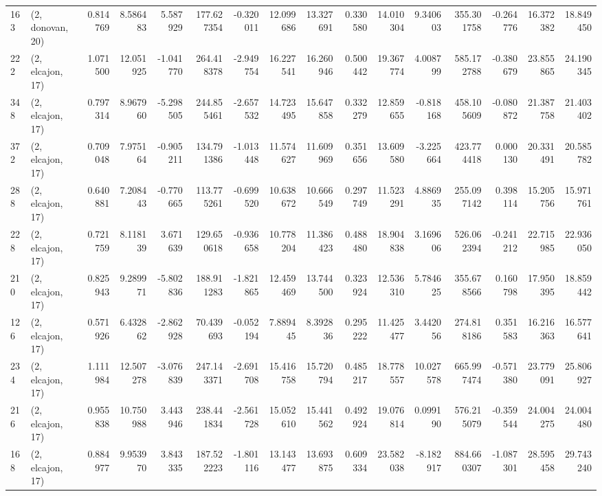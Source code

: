 \begin{tabular}{llrrrrrrrrrrrrrr}
163 &  (2, donovan, 20) &   0.814769 &   8.586483 &   5.587929 &   177.627354 &  -0.320011 &  12.099686 &  13.327691 &  0.330580 &  14.010304 &   9.340603 &    355.301758 &   -0.264776 &   16.372382 &   18.849450 \\
222 &  (2, elcajon, 17) &   1.071500 &  12.051925 &  -1.041770 &   264.418378 &  -2.949754 &  16.227541 &  16.260946 &  0.500442 &  19.367774 &   4.008799 &    585.172788 &   -0.380679 &   23.855865 &   24.190345 \\
348 &  (2, elcajon, 17) &   0.797314 &   8.967960 &  -5.298505 &   244.855461 &  -2.657532 &  14.723495 &  15.647858 &  0.332279 &  12.859655 &  -0.818168 &    458.105609 &   -0.080872 &   21.387758 &   21.403402 \\
372 &  (2, elcajon, 17) &   0.709048 &   7.975164 &  -0.905211 &   134.791386 &  -1.013448 &  11.574627 &  11.609969 &  0.351656 &  13.609580 &  -3.225664 &    423.774418 &    0.000130 &   20.331491 &   20.585782 \\
288 &  (2, elcajon, 17) &   0.640881 &   7.208443 &  -0.770665 &   113.775261 &  -0.699520 &  10.638672 &  10.666549 &  0.297749 &  11.523291 &   4.886935 &    255.097142 &    0.398114 &   15.205756 &   15.971761 \\
228 &  (2, elcajon, 17) &   0.721759 &   8.118139 &   3.671639 &   129.650618 &  -0.936658 &  10.778204 &  11.386423 &  0.488480 &  18.904838 &   3.169606 &    526.062394 &   -0.241212 &   22.715985 &   22.936050 \\
210 &  (2, elcajon, 17) &   0.825943 &   9.289971 &  -5.802836 &   188.911283 &  -1.821865 &  12.459469 &  13.744500 &  0.323924 &  12.536310 &   5.784625 &    355.678566 &    0.160798 &   17.950395 &   18.859442 \\
126 &  (2, elcajon, 17) &   0.571926 &   6.432862 &  -2.862928 &    70.439693 &  -0.052194 &   7.889445 &   8.392836 &  0.295222 &  11.425477 &   3.442056 &    274.818186 &    0.351583 &   16.216363 &   16.577641 \\
234 &  (2, elcajon, 17) &   1.111984 &  12.507278 &  -3.076839 &   247.143371 &  -2.691708 &  15.416758 &  15.720794 &  0.485217 &  18.778557 &  10.027578 &    665.997474 &   -0.571380 &   23.779091 &   25.806927 \\
216 &  (2, elcajon, 17) &   0.955838 &  10.750988 &   3.443946 &   238.441834 &  -2.561728 &  15.052610 &  15.441562 &  0.492924 &  19.076814 &   0.099190 &    576.215079 &   -0.359544 &   24.004275 &   24.004480 \\
168 &  (2, elcajon, 17) &   0.884977 &   9.953970 &   3.843335 &   187.522223 &  -1.801116 &  13.143477 &  13.693875 &  0.609334 &  23.582038 &  -8.182917 &    884.660307 &   -1.087301 &   28.595458 &   29.743240 \\

\end{tabular}
